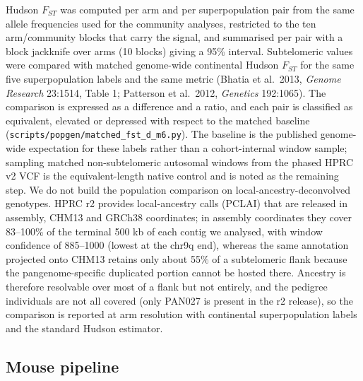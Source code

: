 \documentclass[pdflatex,mathphys]{jnl}
\begin{document}
Hudson $F_{ST}$ was computed per arm and per superpopulation pair from the same allele
frequencies used for the community analyses, restricted to the ten arm/community blocks that
carry the signal, and summarised per pair with a block jackknife over arms (10 blocks) giving a
95\% interval. Subtelomeric values were compared with matched genome-wide continental Hudson
$F_{ST}$ for the same five superpopulation labels and the same metric (Bhatia et al.\ 2013,
\emph{Genome Research} 23:1514, Table 1; Patterson et al.\ 2012, \emph{Genetics} 192:1065). The
comparison is expressed as a difference and a ratio, and each pair is classified as equivalent,
elevated or depressed with respect to the matched baseline
(\texttt{scripts/popgen/matched\_fst\_d\_m6.py}). The baseline is the published genome-wide
expectation for these labels rather than a cohort-internal window sample; sampling matched
non-subtelomeric autosomal windows from the phased HPRC v2 VCF is the equivalent-length native
control and is noted as the remaining step. We do not build the population comparison on local-ancestry-deconvolved genotypes. HPRC
r2 provides local-ancestry calls (PCLAI) that are released in assembly, CHM13 and GRCh38
coordinates; in assembly coordinates they cover 83--100\% of the terminal 500 kb of each contig
we analysed, with window confidence of 885--1000 (lowest at the chr9q end), whereas the same
annotation projected onto CHM13 retains only about 55\% of a subtelomeric flank because the
pangenome-specific duplicated portion cannot be hosted there. Ancestry is therefore resolvable
over most of a flank but not entirely, and the pedigree individuals are not all covered (only
PAN027 is present in the r2 release), so the comparison is reported at arm resolution with
continental superpopulation labels and the standard Hudson estimator.

\subsection*{Mouse pipeline}
\end{document}
